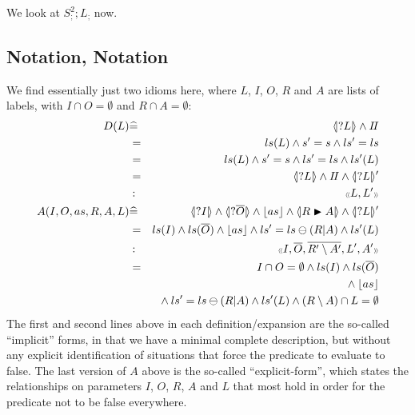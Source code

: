 We look at $S_;^2 ; L_;$ now.

\subsection{Notation, Notation}

We find essentially just two idioms here,
where $L$, $I$, $O$, $R$ and $A$ are lists of labels,
with $I \cap O = \emptyset$ and $R \cap A = \emptyset$:
\begin{eqnarray*}
   D(L) &\defs&  \LS{L} \land \Skip
\\ &=& ls(L) \land s'=s \land ls'=ls
\\ &=& ls(L) \land s'=s \land ls'=ls \land ls'(L)
\\ &=& \LS{L} \land \Skip \land \LSd{L}
\\ &:&  \ltype{L,L'}
\\ A(I,O,as,R,A,L)
   &\defs& \LS{I} \land \LS{\B O} 
           \land \ado{as} 
           \land \LUPD{R}{A} \land \LSd{L}
\\ &=& ls(I) \land ls(\B O) \land \ado{as}
       \land ls'=ls\ominus(R|A) \land ls'(L)
\\ &:& \ltype{I,\B O,\B{R'\setminus A'},L',A'}
\\ &=& I \cap O = \emptyset \land ls(I) \land ls(\B O)
\\ && {} \land \ado{as}
\\ && {} \land ls'=ls\ominus(R|A) \land ls'(L)
         \land (R\setminus A) \cap L = \emptyset
\end{eqnarray*}
The first and second lines above in each definition/expansion
are the so-called ``implicit'' forms,
in that we have a minimal complete description,
but without any explicit identification of situations that force
the predicate to evaluate to false.
The last version of $A$ above is the so-called ``explicit-form'',
which states the relationships on parameters $I$, $O$, $R$, $A$ and $L$
that most hold in order for the predicate not to be false everywhere.



